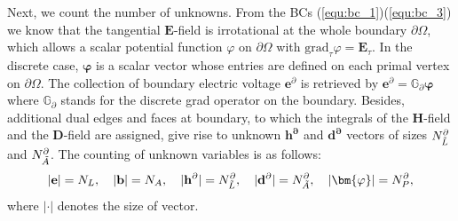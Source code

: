 \documentclass{article}
\begin{document}
Next, we count the number of unknowns. From the BCs (\ref{equ:bc_1})(\ref{equ:bc_3})  we know that the tangential $\mathbf{E}$-field is irrotational at the whole boundary $\partial\Omega$, which allows a scalar potential function $\varphi$ on $\partial \Omega$ with $\text{grad}_\tau \varphi = \mathbf{E}_\tau$. In the discrete case, $\bm{\varphi}$ is a scalar vector whose entries are defined on each primal vertex on $\partial \Omega$. The collection of boundary electric voltage $\mathbf{e}^\partial$ is retrieved by $\mathbf{e}^\partial = \mathbb{G}_\partial \bm{\varphi}$ where $\mathbb{G}_\partial$ stands for the discrete grad operator on the boundary. Besides, additional dual edges and faces at boundary, to which the integrals of the $\mathbf{H}$-field and the $\mathbf{D}$-field are assigned, give rise to unknown $\mathbf{h^\partial}$ and $\mathbf{d^\partial}$ vectors of sizes $N^\partial_{\Tilde{L}}$ and $N^\partial_{\Tilde{A}}$. The counting of unknown variables is as follows:
\begin{equation*}
    |\mathbf{e}| = N_L, \ \ \ |\mathbf{b}|=N_A, \ \ \ |\mathbf{h}^\partial|=N^\partial_{\Tilde{L}},\ \ \ |\mathbf{d}^\partial| = N^\partial_{\Tilde{A}}, \ \ \ |\bm{\varphi}| = N^\partial_P,
\end{equation*}
where $|\cdot|$ denotes the size of vector. 
\end{document}

